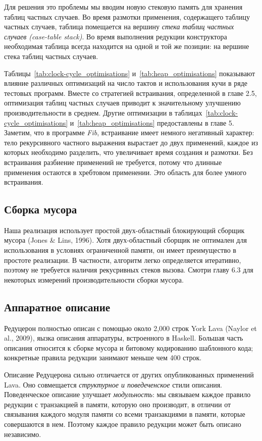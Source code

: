 \documentclass[flenqn, 14pt]{extarticle}
\begin{document}
Для решения это проблемы мы вводим новую стековую память для хранения таблиц частных случаев. Во время размотки применения, содержащего таблицу частных случаев, таблица помещается на вершину \textit{стека таблиц частных случаев (case-table stack)}. Во время выполнения редукции конструктора необходимая таблица всегда находится на одной и той же позиции: на вершине стека таблиц частных случаев.

Таблицы~\ref{tab:clock-cycle_optimisations} и~\ref{tab:heap_optimisations} показывают влияние различных оптимизаций на число тактов и использования кучи в ряде тестовых программ. Вместе со стратегией встраивания, определенной в главе 2.5, оптимизация таблиц частных случаев приводит к значительному улучшению производительности в среднем. Другие оптимизации в таблицах~\ref{tab:clock-cycle_optimisations} и~\ref{tab:heap_optimisations} предоставлены в главе 5. Заметим, что в программе \textit{Fib}, встраивание имеет немного негативный характер: тело рекурсивного частного выражения вырастает до двух применений, каждое из которых необходимо разделить, что увеличивает время создания и размотки. Без встраивания разбиение применений не требуется, потому что длинные применения остаются в хребтовом применении. Это область для более умного встраивания.

\subsection{Сборка мусора}
Наша реализация использует простой двух-областный блокирующий сборщик мусора (Jones \& Lins, 1996). Хотя двух-областный сборщик не оптимален для использования в условиях ограниченной памяти, он имеет преимущество в простоте реализации. В частности, алгоритм легко определяется итеративно, поэтому не требуется наличия рекусривных стеков вызова. Смотри главу 6.3 для некоторых измерений производительности сборки мусора.

\subsection{Аппаратное описание}
Редуцерон полностью описан с помощью около 2,000 строк York Lava (Naylor et al., 2009), яызка описания аппаратуры, встроенного в Haskell. Большая часть описания относится к сборке мусора и битовому кодированию шаблонного кода; конкретные правила редукции занимают меньше чем 400 строк.

Описание Редуцерона сильно отличается от других опубликованных применений Lava. Оно совмещается \textit{структурное и поведеченское} стили описания. Поведенческое описание улучшает \textit{модульность}: мы связываем каждое правило редукции с транзакцией в памяти, которую оно производит, в отличии от связывания каждого модуля памяти со всеми транзакциями в памяти, которые совершаются в нем. Поэтому каждое правило редукции может быть описано независимо. 
\end{document}
